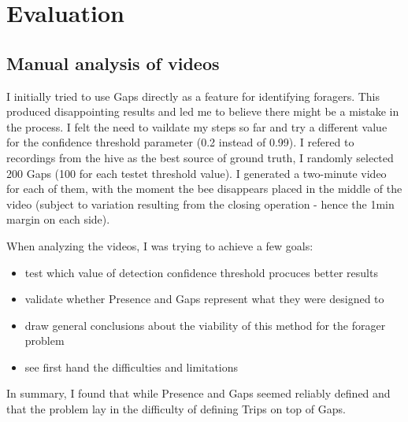 
\chapter{Evaluation}  %

\ifpdf
    \graphicspath{{Chapters/Chapter4/Figs/Raster/}{Chapters/Chapter4/Figs/PDF/}{Chapters/Chapter4/Figs/}}
\else
    \graphicspath{{Chapters/Chapter4/Figs/Vector/}{Chapters/Chapter4/Figs/}}
\fi


\section{Manual analysis of videos}


I initially tried to use Gaps directly as a feature for identifying foragers. This produced disappointing results and led me to believe there might be a mistake in the process. I felt the need to vaildate my steps so far and try a different value for the confidence threshold parameter (0.2 instead of 0.99). I refered to recordings from the hive as the best source of ground truth,
I randomly selected 200 Gaps (100 for each testet threshold value). I generated a two-minute video for each of them, with the moment the bee disappears placed in the middle of the video (subject to variation resulting from the closing operation - hence the 1min margin on each side). 


When analyzing the videos, I was trying to achieve a few goals:
\begin{itemize}
\item test which value of detection confidence threshold procuces better results
\item validate whether Presence and Gaps represent what they were designed to
\item draw general conclusions about the viability of this method for the forager problem
\item see first hand the difficulties and limitations
\end{itemize}

In summary, I found that while Presence and Gaps seemed reliably defined and that the problem lay in the difficulty of defining Trips on top of Gaps.

